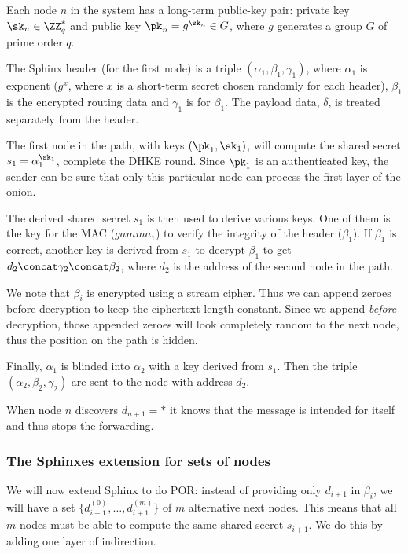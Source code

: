 Each node \(n\) in the system has a long-term public-key pair: private key 
\(\sk_n\in \ZZ_q^*\) and public key \(\pk_n = g^{\sk_n}\in G\), where \(g\) 
generates a group \(G\) of prime order \(q\).

The Sphinx header (for the first node) is a triple \((\alpha_1, \beta_1, 
  \gamma_1)\), where \(\alpha_1\) is  exponent (\(g^x\), where \(x\) 
is a short-term secret chosen randomly for each header), \(\beta_1\) is the 
encrypted routing data and \(\gamma_1\) is  for \(\beta_1\).
The payload data, \(\delta\), is treated separately from the header.

The first node in the path, with keys \((\pk_1, \sk_1)\), will compute the 
shared secret \(s_1 = \alpha_1^{\sk_1}\), \ie complete the \ac{DHKE} round.
Since \(\pk_1\) is an authenticated key, the sender can be sure that only this 
particular node can process the first layer of the onion.

The derived shared secret \(s_1\) is then used to derive various keys.
One of them is the key for the \ac{MAC} (\(gamma_1\)) to verify the integrity 
of the header (\(\beta_1\)).
If \(\beta_1\) is correct, another key is derived from \(s_1\) to decrypt 
\(\beta_1\) to get \(d_2\concat \gamma_2\concat \beta_2\), where \(d_2\) is the 
address of the second node in the path.

We note that \(\beta_i\) is encrypted using a stream cipher.
Thus we can append zeroes before decryption to keep the ciphertext length 
constant.
Since we append \emph{before} decryption, those appended zeroes will look 
completely random to the next node, thus the position on the path is hidden.

Finally, \(\alpha_1\) is blinded into \(\alpha_2\) with a key derived from 
\(s_1\).
Then the triple \((\alpha_2, \beta_2, \gamma_2)\) are sent to the node with 
address \(d_2\).

When node \(n\) discovers \(d_{n+1} = *\) it knows that the message is intended 
for itself and thus stops the forwarding.

\subsubsection{The Sphinxes extension for sets of nodes}

We will now extend Sphinx to do \ac{POR}: instead of providing only \(d_{i+1}\) 
in \(\beta_i\), we will have a set \(\{d_{i+1}^{(0)}, \dotsc, d_{i+1}^{(m)}\}\) 
of \(m\) alternative next nodes.
This means that all \(m\) nodes must be able to compute the same shared secret 
\(s_{i+1}\).
We do this by adding one layer of indirection.

